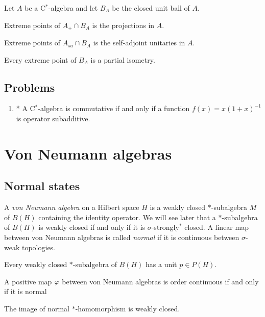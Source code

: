 \documentclass{../../large}
\begin{document}
\begin{prb}
Let $A$ be a C$^*$-algebra and let $B_A$ be the closed unit ball of $A$.
\begin{parts}
\item Extreme points of $A_+\cap B_A$ is the projections in $A$.
\item Extreme points of $A_{sa}\cap B_A$ is the self-adjoint unitaries in $A$.
\item Every extreme point of $B_A$ is a partial isometry.
\end{parts}
\end{prb}

\section*{Problems}
\begin{enumerate}
\item* A C$^*$-algebra is commutative if and only if a function $f(x)=x(1+x)^{-1}$ is operator subadditive.
\end{enumerate}







\chapter{Von Neumann algebras}

\section{Normal states}

\begin{prb}
A \emph{von Neumann algebra} on a Hilbert space $H$ is a weakly closed $*$-subalgebra $M$ of $B(H)$ containing the identity operator.
We will see later that a $*$-subalgebra of $B(H)$ is weakly closed if and only if it is $\sigma$-strongly$^*$ closed.
A linear map between von Neumann algebras is called \emph{normal} if it is continuous between $\sigma$-weak topologies.
\begin{parts}
\item Every weakly closed $*$-subalgebra of $B(H)$ has a unit $p\in P(H)$.
\item A positive map $\varphi$ between von Neumann algebras is order continuous if and only if it is normal
\item The image of normal $*$-homomorphism is weakly closed.
\end{parts}
\end{prb}
\end{document}
